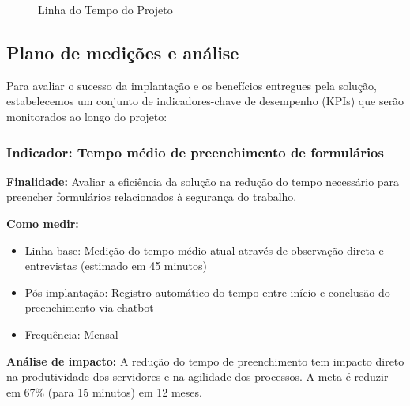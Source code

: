 \documentclass[12pt,a4paper]{article}
\begin{document}
\begin{figure}[h]
\centering
{}
\caption{Linha do Tempo do Projeto}
\end{figure}

\clearpage
\subsection{Plano de medições e análise}

Para avaliar o sucesso da implantação e os benefícios entregues pela solução, estabelecemos um conjunto de indicadores-chave de desempenho (KPIs) que serão monitorados ao longo do projeto:

\subsubsection{Indicador: Tempo médio de preenchimento de formulários}

\textbf{Finalidade:} Avaliar a eficiência da solução na redução do tempo necessário para preencher formulários relacionados à segurança do trabalho.

\textbf{Como medir:} 
\begin{itemize}
    \item Linha base: Medição do tempo médio atual através de observação direta e entrevistas (estimado em 45 minutos)
    \item Pós-implantação: Registro automático do tempo entre início e conclusão do preenchimento via chatbot
    \item Frequência: Mensal
\end{itemize}

\textbf{Análise de impacto:} A redução do tempo de preenchimento tem impacto direto na produtividade dos servidores e na agilidade dos processos. A meta é reduzir em 67\% (para 15 minutos) em 12 meses.
\end{document}
